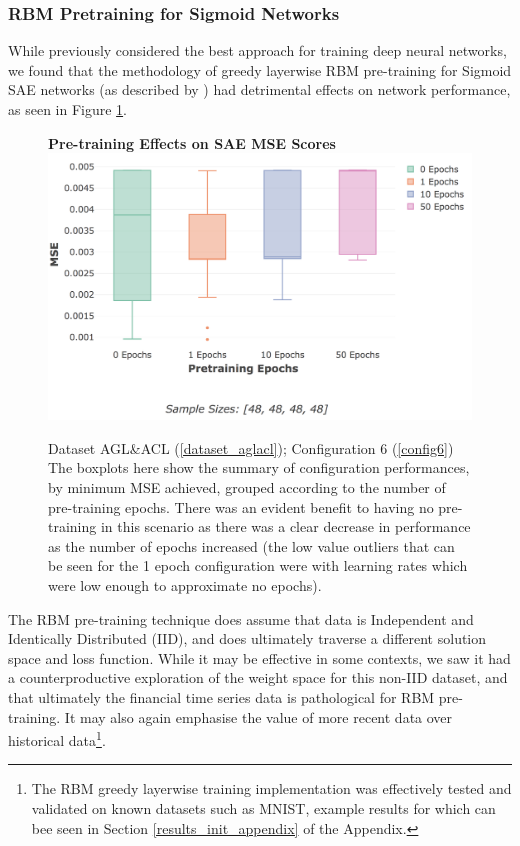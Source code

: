 \documentclass[a4paper,11pt,oneside]{article}
\theoremstyle{plain}
\theoremstyle{definition}
\begin{document}
	\subsubsection{RBM Pretraining for Sigmoid Networks}
	
	While previously considered the best approach for training deep neural networks, we found that the methodology of greedy layerwise RBM pre-training for Sigmoid SAE networks (as described by \citet{Hinton2}) had detrimental effects on network performance, as seen in Figure \ref{figure-results-pretraining-effect}. \newline
	
	\begin{figure}[H]
		\centering
		\textbf{Pre-training Effects on SAE MSE Scores} 
		\includegraphics[scale=0.45]{images/results/8_4_weight_init/actual_sigmoid_pt.png}
		\caption[Pre-training Effects on SAE MSE Scores]
		{Dataset AGL\&ACL (\ref{dataset_aglacl}); Configuration 6 (\ref{config6})
			\newline \newline The boxplots here show the summary of configuration performances, by minimum MSE achieved, grouped according to the number of pre-training epochs. There was an evident benefit to having no pre-training in this scenario as there was a clear decrease in performance as the number of epochs increased (the low value outliers that can be seen for the 1 epoch configuration were with learning rates which were low enough to approximate no epochs).}
		\label{figure-results-pretraining-effect}
	\end{figure}		
	
	The RBM pre-training technique does assume that data is Independent and Identically Distributed (IID), and does ultimately traverse a different solution space and loss function. While it may be effective in some contexts, we saw it had a counterproductive exploration of the weight space for this non-IID dataset, and that ultimately the financial time series data is pathological for RBM pre-training. It may also again emphasise the value of more recent data over historical data\footnote{The RBM greedy layerwise training implementation was effectively tested and validated on known datasets such as MNIST, example results for which can bee seen in Section \ref{results_init_appendix} of the Appendix.}.\newline 
	
\end{document}
